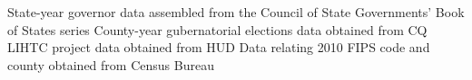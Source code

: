 State-year governor data assembled from the Council of State Governments' Book of States series
County-year gubernatorial elections data obtained from CQ
LIHTC project data obtained from HUD
Data relating 2010 FIPS code and county obtained from Census Bureau